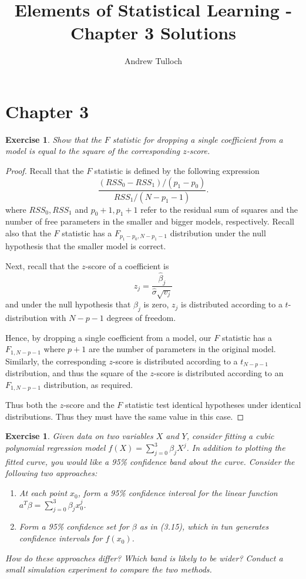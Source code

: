 \documentclass[12pt]{amsart}
\title{Elements of Statistical Learning - Chapter 3 Solutions}								%
\author{Andrew Tulloch}
\theoremstyle{plain}%
\newtheorem{exer}[thm]{Exercise}
\theoremstyle{definition}
\theoremstyle{remark}
\begin{document}
\maketitle
\setcounter{section}{2}

\section{Chapter 3}

\begin{exer}
  Show that the $F$ statistic for dropping a single coefficient from a model is equal to the square of the corresponding $z$-score.
\end{exer}

\begin{proof}
  Recall that the $F$ statistic is defined by the following expression \[
    \frac{(RSS_0 - RSS_1) / (p_1 - p_0)}{RSS_1 / (N - p_1 - 1)}.
  \] where $RSS_0, RSS_1$ and $p_0 + 1, p_1 + 1$ refer to the residual sum of squares and the number of free parameters in the smaller and bigger models, respectively.  Recall also that the $F$ statistic has a $F_{p_1 - p_0, N-p_1 - 1}$ distribution under the null hypothesis that the smaller model is correct.

  Next, recall that the $z$-score of a coefficient is \[
    z_j = \frac{\hat \beta_j}{\hat \sigma \sqrt{v_j}}
  \] and under the null hypothesis that $\beta_j$ is zero, $z_j$ is distributed according to a $t$-distribution with $N-p-1$ degrees of freedom. 

  Hence, by dropping a single coefficient from a model, our $F$ statistic has a $F_{1, N-p - 1}$ where $p + 1$ are the number of parameters in the original model.  Similarly, the corresponding $z$-score is distributed according to a $t_{N-p-1}$ distribution, and thus the square of the $z$-score is distributed according to an $F_{1, N-p-1}$ distribution, as required.

  Thus both the $z$-score and the $F$ statistic test identical hypotheses under identical distributions.  Thus they must have the same value in this case.    
\end{proof}

\begin{exer}
    Given data on two variables $X$ and $Y$, consider fitting a cubic polynomial regression model $f(X) = \sum_{j=0}^{3} \beta_j X^j$.  In addition to plotting the fitted curve, you would like a 95\% confidence band about the curve.  Consider the following two approaches:

\begin{enumerate}
    \item At each point $x_0$, form a 95\% confidence interval for the linear function $a^T \beta = \sum_{j=0}^{3}\beta_j x_0^j$.  
    \item Form a 95\% confidence set for $\beta$ as in (3.15), which in tun generates confidence intervals for $f(x_0)$.  
\end{enumerate}

   How do these approaches differ?  Which band is likely to be wider?  Conduct a small simulation experiment to compare the two methods.
\end{exer}
\end{document}
